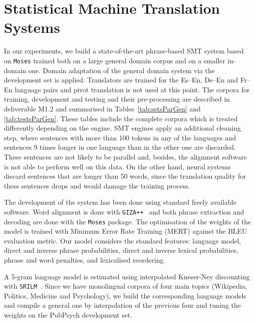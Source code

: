\documentclass[a4paper,11pt]{article}
\begin{document}
\section{Statistical Machine Translation Systems}
\label{s:smt}

In our experiments, we build a state-of-the-art phrase-based SMT system based on {\tt Moses} \cite{moses:2007} trained both on a large general domain corpus and on a smaller in-domain one. Domain adaptation of the general domain system via the development set is applied. Translators are trained for the Es--En, De--En and Fr--En language pairs and pivot translation is not used at this point. 
The corpora for training, development and testing and their pre-processing are described in deliverable M1.2 and summarised in Tables~\ref{tab:setsParGen} and \ref{tab:testsParGen}. These tables include the complete corpora which is treated differently depending on the engine. SMT engines apply an additional cleaning step, where sentences with more than 100 tokens in any of the languages and sentences 9 times longer in one language than in the other one are discarded. These sentences are not likely to be parallel and, besides, the alignment software is not able to perform well on this data. 
On the other hand, neural systems discard sentences that are longer than 50 words, since the translation quality for these sentences drops and would damage the training process.

The development of the system has been done using standard freely available software. 
Word alignment is done with {\tt GIZA++}~\cite{giza} and both phrase extraction and decoding are done with the {\tt Moses} package. The optimisation of the weights of the model is trained with  Minimum Error Rate Training (MERT) \cite{och2003} against the BLEU evaluation metric.  Our model considers the standard features: language model, direct and inverse phrase probabilities, direct and inverse lexical probabilities, phrase and word penalties, and lexicalised reordering.

A 5-gram language model is estimated using interpolated Kneser-Ney discounting with {\tt SRILM}~\cite{srilm}. Since we have monolingual corpora of four main topics (Wikipedia, Politics, Medicine and Psychology), we build the corresponding language models and compile a general one by interpolation of the previous four and tuning the weights on the PubPsych development set.
\end{document}
